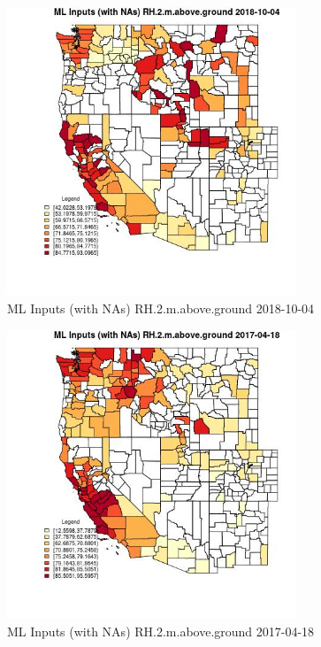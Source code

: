 \begin{figure} 
\centering  
\includegraphics[width=0.77\textwidth]{Code_Outputs/Report_ML_input_PM25_Step4_part_f_de_duplicated_aves_prioritize_24hr_obswNAs_CountyRH2mabovegroundMean2018-10-04.jpg} 
\caption{\label{fig:Report_ML_input_PM25_Step4_part_f_de_duplicated_aves_prioritize_24hr_obswNAsCountyRH2mabovegroundMean2018-10-04}ML Inputs (with NAs) RH.2.m.above.ground 2018-10-04} 
\end{figure} 
 

\begin{figure} 
\centering  
\includegraphics[width=0.77\textwidth]{Code_Outputs/Report_ML_input_PM25_Step4_part_f_de_duplicated_aves_prioritize_24hr_obswNAs_CountyRH2mabovegroundMean2017-04-18.jpg} 
\caption{\label{fig:Report_ML_input_PM25_Step4_part_f_de_duplicated_aves_prioritize_24hr_obswNAsCountyRH2mabovegroundMean2017-04-18}ML Inputs (with NAs) RH.2.m.above.ground 2017-04-18} 
\end{figure} 
 

